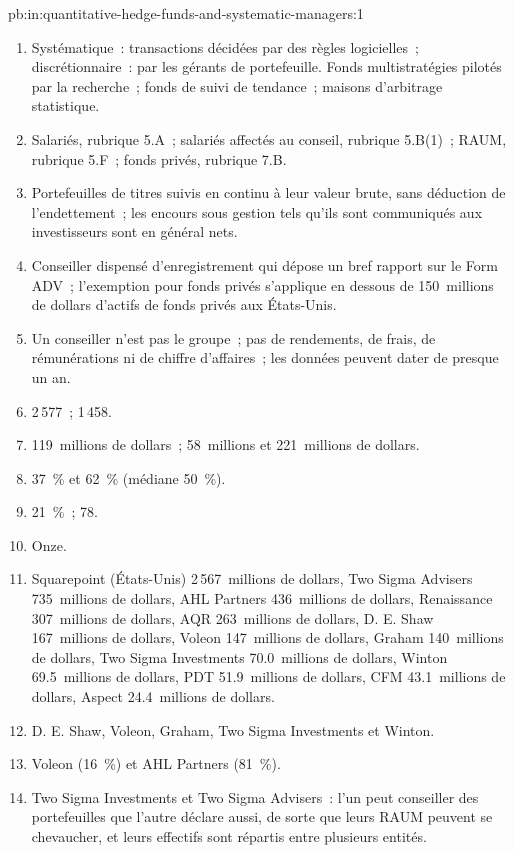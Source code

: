 \begin{solution}{pb:in:quantitative-hedge-funds-and-systematic-managers:1}
\begin{enumerate}
\item Systématique~: transactions décidées par des règles logicielles~; discrétionnaire~: par les gérants de portefeuille. Fonds multistratégies
pilotés par la recherche~; fonds de suivi de tendance~; maisons d'arbitrage statistique.
\item Salariés, rubrique 5.A~; salariés affectés au conseil, rubrique 5.B(1)~; RAUM, rubrique 5.F~; fonds privés, rubrique 7.B.
\item Portefeuilles de titres suivis en continu à leur valeur brute, sans déduction de l'endettement~; les encours sous gestion
tels qu'ils sont communiqués aux investisseurs sont en général nets.
\item Conseiller dispensé d'enregistrement qui dépose un bref rapport sur le Form ADV~; l'exemption pour fonds privés s'applique en dessous
de 150~millions de dollars d'actifs de fonds privés aux États-Unis.
\item Un conseiller n'est pas le groupe~; pas de rendements, de frais, de rémunérations ni de chiffre d'affaires~; les données peuvent dater de presque un an.
\item 2\,577~; 1\,458.
\item 119~millions de dollars~; 58~millions et 221~millions de dollars.
\item 37~\% et 62~\% (médiane 50~\%).
\item 21~\%~; 78.
\item Onze.
\item Squarepoint (États-Unis) 2\,567~millions de dollars, Two Sigma Advisers 735~millions de dollars, AHL Partners 436~millions de dollars, Renaissance 307~millions de dollars, AQR 263~millions de dollars, D. E.
Shaw 167~millions de dollars, Voleon 147~millions de dollars, Graham 140~millions de dollars, Two Sigma Investments 70.0~millions de dollars, Winton 69.5~millions de dollars, PDT 51.9~millions de dollars, CFM 43.1~millions de dollars,
Aspect 24.4~millions de dollars.
\item D. E. Shaw, Voleon, Graham, Two Sigma Investments et Winton.
\item Voleon (16~\%) et AHL Partners (81~\%).
\item Two Sigma Investments et Two Sigma Advisers~: l'un peut conseiller des portefeuilles que l'autre déclare aussi, de sorte que leurs RAUM peuvent
se chevaucher, et leurs effectifs sont répartis entre plusieurs entités.

\end{enumerate}
\end{solution}
